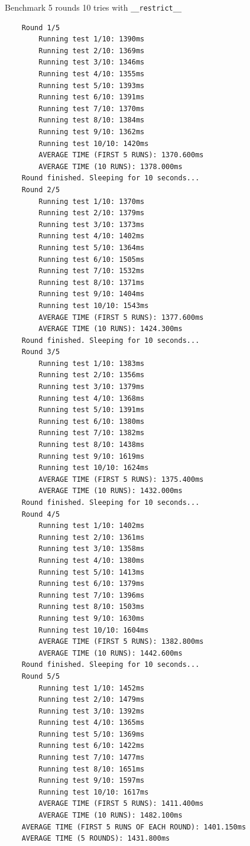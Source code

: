 Benchmark 5 rounds 10 tries with \verb|__restrict__|
\footnotesize\begin{verbatim}
    Round 1/5
        Running test 1/10: 1390ms
        Running test 2/10: 1369ms
        Running test 3/10: 1346ms
        Running test 4/10: 1355ms
        Running test 5/10: 1393ms
        Running test 6/10: 1391ms
        Running test 7/10: 1370ms
        Running test 8/10: 1384ms
        Running test 9/10: 1362ms
        Running test 10/10: 1420ms
        AVERAGE TIME (FIRST 5 RUNS): 1370.600ms
        AVERAGE TIME (10 RUNS): 1378.000ms
    Round finished. Sleeping for 10 seconds...
    Round 2/5
        Running test 1/10: 1370ms
        Running test 2/10: 1379ms
        Running test 3/10: 1373ms
        Running test 4/10: 1402ms
        Running test 5/10: 1364ms
        Running test 6/10: 1505ms
        Running test 7/10: 1532ms
        Running test 8/10: 1371ms
        Running test 9/10: 1404ms
        Running test 10/10: 1543ms
        AVERAGE TIME (FIRST 5 RUNS): 1377.600ms
        AVERAGE TIME (10 RUNS): 1424.300ms
    Round finished. Sleeping for 10 seconds...
    Round 3/5
        Running test 1/10: 1383ms
        Running test 2/10: 1356ms
        Running test 3/10: 1379ms
        Running test 4/10: 1368ms
        Running test 5/10: 1391ms
        Running test 6/10: 1380ms
        Running test 7/10: 1382ms
        Running test 8/10: 1438ms
        Running test 9/10: 1619ms
        Running test 10/10: 1624ms
        AVERAGE TIME (FIRST 5 RUNS): 1375.400ms
        AVERAGE TIME (10 RUNS): 1432.000ms
    Round finished. Sleeping for 10 seconds...
    Round 4/5
        Running test 1/10: 1402ms
        Running test 2/10: 1361ms
        Running test 3/10: 1358ms
        Running test 4/10: 1380ms
        Running test 5/10: 1413ms
        Running test 6/10: 1379ms
        Running test 7/10: 1396ms
        Running test 8/10: 1503ms
        Running test 9/10: 1630ms
        Running test 10/10: 1604ms
        AVERAGE TIME (FIRST 5 RUNS): 1382.800ms
        AVERAGE TIME (10 RUNS): 1442.600ms
    Round finished. Sleeping for 10 seconds...
    Round 5/5
        Running test 1/10: 1452ms
        Running test 2/10: 1479ms
        Running test 3/10: 1392ms
        Running test 4/10: 1365ms
        Running test 5/10: 1369ms
        Running test 6/10: 1422ms
        Running test 7/10: 1477ms
        Running test 8/10: 1651ms
        Running test 9/10: 1597ms
        Running test 10/10: 1617ms
        AVERAGE TIME (FIRST 5 RUNS): 1411.400ms
        AVERAGE TIME (10 RUNS): 1482.100ms
    AVERAGE TIME (FIRST 5 RUNS OF EACH ROUND): 1401.150ms
    AVERAGE TIME (5 ROUNDS): 1431.800ms
\end{verbatim}
\normalsize
